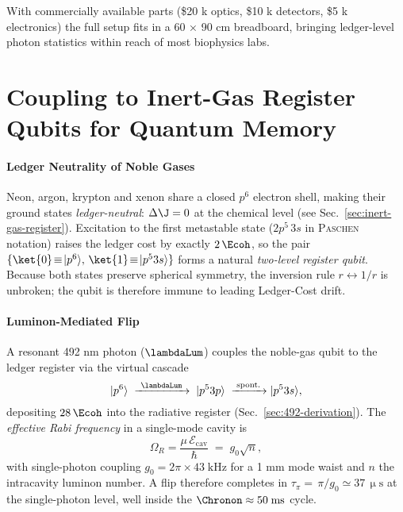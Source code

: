 \documentclass[11pt,oneside]{book}
\begin{document}
{With commercially available parts (\$20 k optics, \$10 k detectors,
\$5 k electronics) the full setup fits in a 60 × 90 cm breadboard,
bringing ledger-level photon statistics within reach of most
biophysics labs.

\section{Coupling to Inert-Gas Register Qubits for Quantum Memory}
\label{sec:inert-gas-qubits}

\paragraph{Ledger Neutrality of Noble Gases}

Neon, argon, krypton and xenon share a closed $p^{6}$ electron shell,
making their ground states \emph{ledger-neutral}:
\(
   \Delta\J = 0
\)
at the chemical level (see Sec.~\ref{sec:inert-gas-register}).
Excitation to the first metastable state
($2p^{5}\,3s$ in \textsc{Paschen} notation)
raises the ledger cost by exactly
\(
   2\,\Ecoh
\),
so the pair
\(
   \{\ket{0}\!\equiv\!|p^{6}\rangle,\,\ket{1}\!\equiv\!|p^{5}3s\rangle\}
\)
forms a natural \emph{two-level register qubit}.
Because both states preserve spherical symmetry, the inversion rule
$r\!\leftrightarrow\!1/r$ is unbroken; the qubit is therefore immune
to leading Ledger-Cost drift.

\paragraph{Luminon-Mediated Flip}

A resonant 492 nm photon (\(\lambdaLum\)) couples the noble-gas qubit
to the ledger register via the virtual cascade
\[
   |p^{6}\rangle
   \;\xrightarrow{\ \lambdaLum\ }\;
   |p^{5}3p\rangle
   \;\xrightarrow{\;\text{spont.}\;}
   |p^{5}3s\rangle,
\]
depositing $28\,\Ecoh$ into the radiative register
(Sec.~\ref{sec:492-derivation}).
The \emph{effective Rabi frequency} in a single-mode cavity is
\[
   \Omega_{R}
   =
   \frac{\mu\,\mathcal{E}_{\text{cav}}}{\hbar}
   \;=\;
   g_{0}\sqrt{n},
\]
with single-photon coupling
\(g_{0}\!=\!2\pi\times43\;\text{kHz}\) for a 1 mm mode waist and
$n$ the intracavity luminon number.
A flip therefore completes in
\(
   \tau_{\pi}=\,\pi/g_{0}
   \simeq 37\,\upmu\text{s}
\)
at the single-photon level, well inside the
\(\Chronon\approx50\;\text{ms}\) cycle.

}
\end{document}
